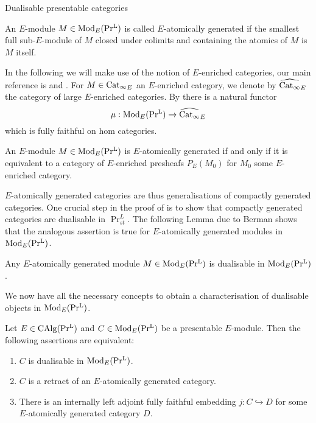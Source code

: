 \begin{subsection}{Dualisable presentable categories}
\begin{definition}\Cite[Definition 1.27]{ramzi2024dualizable}
    An $E$-module $M\in \operatorname{Mod}_E(\operatorname{Pr^{L}})$ is called $E$-atomically generated if the smallest full sub-$E$-module of $M$ closed under colimits and containing the atomics of $M$ is $M$ itself.
\end{definition}
In the following we will make use of the notion of $E$-enriched categories, our main reference is \Cite{heine2023equivalence} and \Cite[Appendix C]{heyer20246}. For $M\in \operatorname{Cat_{\infty}}_E$ an $E$-enriched category, we denote by  $\widehat{\operatorname{Cat_{\infty}}}_E$  the category of large $E$-enriched categories. By \Cite[Theorem 1.2]{heine2023equivalence} there is a natural functor 
\[
\mu : \operatorname{Mod}_E(\operatorname{Pr^{L}}) \to  \widehat{\operatorname{Cat_{\infty}}}_E
\]
which is fully faithful on hom categories. 
\begin{lemma}\Cite[Observation 1.28]{ramzi2024dualizable}
An $E$-module $M\in \operatorname{Mod}_E(\operatorname{Pr^{L}})$ is $E$-atomically generated  if and only if it is equivalent to a category of $E$-enriched presheafs  $P_{E}(M_0)$ for $M_0$ some $E$-enriched category.
\end{lemma}
$E$-atomically generated categories are thus generalisations of compactly generated categories. One crucial step in the proof of  is to show that compactly generated categories are dualisable in $\Pr_{st}^L$. The following Lemma due to Berman \Cite[Theorem 1.7]{berman2020enriched} shows that the analogous assertion is true for $E$-atomically generated modules in $\operatorname{Mod}_E(\operatorname{Pr^{L}})$.
\begin{lemma}\Cite[Proposition 1.40]{ramzi2024dualizable}
 Any $E$-atomically generated module $M\in \operatorname{Mod}_E(\operatorname{Pr^{L}})$ is dualisable in $\operatorname{Mod}_E(\operatorname{Pr^{L}})$.
\end{lemma}

We now have all the necessary concepts to obtain a characterisation of dualisable objects in $\operatorname{Mod}_E(\operatorname{Pr^{L}})$.
\begin{theorem}\Cite[Theorem 1.49]{ramzi2024dualizable}\label{dlb relative in PrL}
    Let $E\in \operatorname{CAlg}(\operatorname{Pr^{L}})$ and  $C\in \operatorname{Mod}_E(\operatorname{Pr^{L}})$ be a presentable $E$-module. Then the following assertions are equivalent:
    \begin{enumerate}
\item $C$ is dualisable in $\operatorname{Mod}_E(\operatorname{Pr^{L}})$.
\item $C$ is a retract of an  $E$-atomically generated category.
\item There is an internally left adjoint fully faithful embedding $j : C \hookrightarrow D$ for some $E$-atomically generated category $D$.
    \end{enumerate}
\end{theorem}


\end{subsection}
